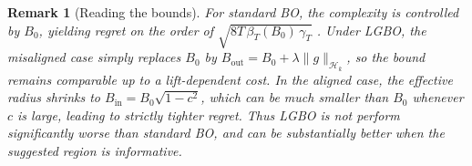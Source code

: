 \documentclass{article} %
\newtheorem{theorem}{Theorem}
\newtheorem{remark}{Remark}
\begin{document}
\begin{remark}[Reading the bounds]
For standard BO, the complexity is controlled by $B_0$, yielding regret on the order of $\sqrt{8T\,\beta_T(B_0)\,\gamma_T}$ \citep{srinivas2009gaussian}. 
Under LGBO, the misaligned case simply replaces $B_0$ by $B_{\mathrm{out}}=B_0+\lambda\|g\|_{\mathcal{H}_k}$, so the bound remains comparable up to a lift-dependent cost. 
In the aligned case, the effective radius shrinks to $B_{\mathrm{in}}=B_0\sqrt{1-c^2}$, which can be much smaller than $B_0$ whenever $c$ is large, leading to strictly tighter regret. 
Thus LGBO is  not perform significantly worse than standard BO, and can be substantially better when the suggested region is informative.
\end{remark}




\end{document}
